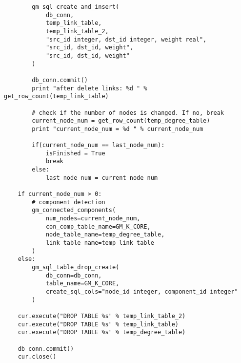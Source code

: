 \begin{lstlisting}
        gm_sql_create_and_insert(
            db_conn,
            temp_link_table,
            temp_link_table_2,
            "src_id integer, dst_id integer, weight real",
            "src_id, dst_id, weight",
            "src_id, dst_id, weight"
        )

        db_conn.commit()
        print "after delete links: %d " % get_row_count(temp_link_table)

        # check if the number of nodes is changed. If no, break
        current_node_num = get_row_count(temp_degree_table)
        print "current_node_num = %d " % current_node_num

        if(current_node_num == last_node_num):
            isFinished = True
            break
        else:
            last_node_num = current_node_num

    if current_node_num > 0:
        # component detection
        gm_connected_components(
            num_nodes=current_node_num,
            con_comp_table_name=GM_K_CORE,
            node_table_name=temp_degree_table,
            link_table_name=temp_link_table
        )
    else:
        gm_sql_table_drop_create(
            db_conn=db_conn,
            table_name=GM_K_CORE,
            create_sql_cols="node_id integer, component_id integer"
        )

    cur.execute("DROP TABLE %s" % temp_link_table_2)
    cur.execute("DROP TABLE %s" % temp_link_table)
    cur.execute("DROP TABLE %s" % temp_degree_table)

    db_conn.commit()
    cur.close()
\end{lstlisting}